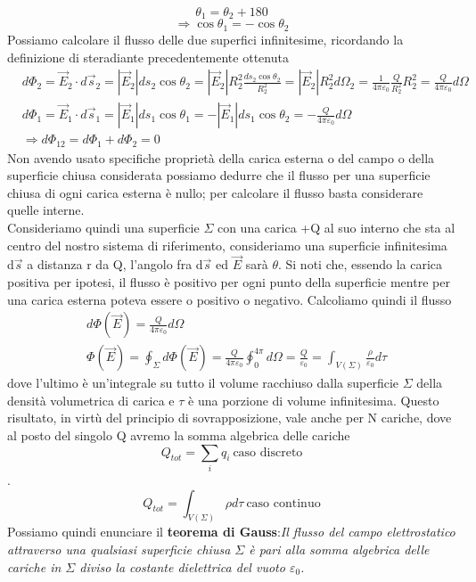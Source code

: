 \documentclass[10pt,a4paper]{article}
\begin{document}
\[\theta_1 = \theta_2 + 180\]
\[\Rightarrow \cos\theta_1 = -\cos\theta_2\]
Possiamo calcolare il flusso delle due superfici infinitesime, ricordando la definizione di steradiante precedentemente ottenuta
\begin{align*}
	&d\Phi_2 = \vec{E}_2\cdot d\vec{s}_2 = |\vec{E}_2| ds_2 \cos\theta_2 = |\vec{E}_2| R_2^2 \frac{ ds_2 \cos\theta_2}{R_2^2} = |\vec{E}_2| R_2^2 d\Omega_2 =\frac{1}{4\pi\varepsilon_0}\frac{Q}{R^2_2}R^2_2= \frac{Q}{4\pi\varepsilon_0}d\Omega \\
	&d\Phi_1 = \vec{E}_1\cdot d\vec{s}_1 = |\vec{E}_1| ds_1 \cos\theta_1 = -|\vec{E}_1| ds_1 \cos\theta_2 = -\frac{Q}{4\pi\varepsilon_0}d\Omega\\
	&\Rightarrow d\Phi_{12} = d\Phi_1 + d\Phi_2 = 0
\end{align*}
Non avendo usato specifiche proprietà della carica esterna o del campo o della superficie chiusa considerata possiamo dedurre che il flusso per una superficie chiusa di ogni carica esterna è nullo; per calcolare il flusso basta considerare quelle interne.\\
Consideriamo quindi una superficie \(\Sigma\) con una carica +Q al suo interno che sta al centro del nostro sistema di riferimento, consideriamo una superficie infinitesima d$\vec{s}$ a distanza r da Q, l'angolo fra d$\vec{s}$ ed $\vec{E}$ sarà $\theta$. Si noti che, essendo la carica positiva per ipotesi, il flusso è positivo per ogni punto della superficie mentre per una carica esterna poteva essere o positivo o negativo. Calcoliamo quindi il flusso
\begin{align*}
	&d\Phi(\vec{E}) = \frac{Q}{4\pi\varepsilon_0}d\Omega\\
	&\Phi(\vec{E}) = \oint_{\Sigma} d\Phi(\vec{E}) = \frac{Q}{4\pi\varepsilon_0}\oint_0^{4\pi}d\Omega = \frac{Q}{\varepsilon_0} = \int_{V(\Sigma)}\frac{\rho}{\varepsilon_0}d\tau
	\end{align*}
dove l'ultimo è un'integrale su tutto il volume racchiuso dalla superficie $\Sigma$ della densità volumetrica di carica e $\tau$ è una porzione di volume infinitesima. Questo risultato, in virtù del principio di sovrapposizione, vale anche per N cariche, dove al posto del singolo Q avremo la somma algebrica delle cariche 
\[Q_{tot} = \sum_iq_i\ \text{caso discreto}\]. 
\[Q_{tot} = \int_{V(\Sigma)}\rho d\tau\ \text{caso continuo}\]
Possiamo quindi enunciare il \textbf{teorema di Gauss}:\textit{Il flusso del campo elettrostatico attraverso una qualsiasi superficie chiusa $\Sigma$ è pari alla somma algebrica delle cariche in \(\Sigma\) diviso la costante dielettrica del vuoto $\varepsilon_0$.}
\end{document}
